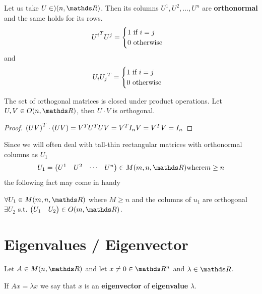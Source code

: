 \documentclass[computationalMathematics.tex]{subfiles}
\begin{document}
\begin{proposition}
  Let us take $U \in )(n, \R)$.
  Then its columns $U^1, U^2, \ldots, U^n$ are \textbf{orthonormal} and the same holds for its rows.
  \[
  {U^i}^{T} U^j = \begin{cases}
    1 \text{ if } i=j\\
    0 \text{ otherwise}
  \end{cases}
  \]
  and
  \[
    U_i {U_j}^{T} = \begin{cases}
    1 \text{ if } i=j\\
    0 \text{ otherwise}
  \end{cases}
  \]
\end{proposition}

\begin{proposition}
  The set of orthogonal matrices is closed under product operations.
  Let $U, V \in O(n, \R)$, then $U \cdot V$ is orthogonal.
\end{proposition}

\begin{proof}
  ${(UV)}^{T} \cdot (UV) = {V}^{T} {U}^{T} U V = {V}^{T} I_n V = {V}^{T} V = I_n$
\end{proof}

Since we will often deal with tall-thin rectangular matrices with
orthonormal columns as $U_1$
  \[
    U_1 = \begin{pmatrix} U^1 & U^2 & \cdots & U^n\end{pmatrix} \in M(m, n, \R) \text{where} m \geq n
  \]
the following fact may come in handy

\begin{proposition}
  $\forall U_1 \in M(m, n, \R)$ where $M \ge n$ and the columns of $u_1$ are orthogonal $\exists U_2$ s.t. $\begin{pmatrix} U_1 & U_2 \end{pmatrix} \in O(m, \R)$.
\end{proposition}

\section{Eigenvalues / Eigenvector}

\begin{definition}
  Let $A \in M(n, \R)$ and let $x \neq 0 \in \R^n$ and $\lambda \in \R$.

  If $Ax = \lambda x$ we say that $x$ is an \textbf{eigenvector} of \textbf{eigenvalue} $\lambda$.
\end{definition}
\end{document}
